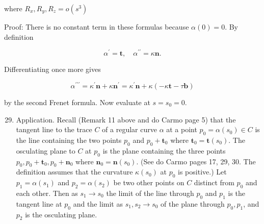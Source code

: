 \documentclass[10pt]{article}
\begin{document}
where $R_{x}, R_{y}, R_{z}=o\left(s^{3}\right)$

Proof: There is no constant term in these formulas because $\alpha(0)=0$. By definition

$$
\alpha^{\prime}=\mathbf{t}, \quad \alpha^{\prime \prime}=\kappa \mathbf{n} .
$$

Differentiating once more gives

$$
\alpha^{\prime \prime \prime}=\kappa^{\prime} \mathbf{n}+\kappa \mathbf{n}^{\prime}=\kappa^{\prime} \mathbf{n}+\kappa(-\kappa \mathbf{t}-\tau \mathbf{b})
$$

by the second Frenet formula. Now evaluate at $s=s_{0}=0$.

\begin{enumerate}
  \setcounter{enumi}{28}
  \item Application. Recall (Remark 11 above and do Carmo page 5) that the tangent line to the trace $C$ of a regular curve $\alpha$ at a point $p_{0}=\alpha\left(s_{0}\right) \in C$ is the line containing the two points $p_{0}$ and $p_{0}+\mathbf{t}_{0}$ where $\mathbf{t}_{0}=\mathbf{t}\left(s_{0}\right)$. The osculating plane to $C$ at $p_{0}$ is the plane containing the three points $p_{0}, p_{0}+\mathbf{t}_{0}, p_{0}+\mathbf{n}_{0}$ where $\mathbf{n}_{0}=\mathbf{n}\left(s_{0}\right)$. (See do Carmo pages 17, 29, 30. The definition assumes that the curvature $\kappa\left(s_{0}\right)$ at $p_{0}$ is positive.) Let $p_{1}=\alpha\left(s_{1}\right)$ and $p_{2}=\alpha\left(s_{2}\right)$ be two other points on $C$ distinct from $p_{0}$ and each other. Then as $s_{1} \rightarrow s_{0}$ the limit of the line through $p_{0}$ and $p_{1}$ is the tangent line at $p_{0}$ and the limit as $s_{1}, s_{2} \rightarrow s_{0}$ of the plane through $p_{0}, p_{1}$, and $p_{2}$ is the osculating plane.
\end{enumerate}
\end{document}
